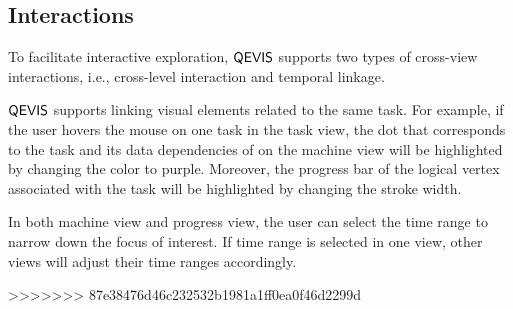 \subsection{Interactions}
%
%


To facilitate interactive exploration, $\mathsf{QEVIS}$ supports two types of cross-view interactions, i.e., cross-level interaction and temporal linkage.

$\mathsf{QEVIS}$ supports linking visual elements related to the same task. 
For example, if the user hovers the mouse on one task in the task view, the dot that corresponds to the task and its data dependencies of on the machine view will be highlighted by changing the color to purple. Moreover, the progress bar of the logical vertex associated with the task will be highlighted by changing the stroke width.   

In both machine view and progress view, the user can select the time range to narrow down the focus of interest. If time range is selected in one view, other views will adjust their time ranges accordingly.

>>>>>>> 87e38476d46c232532b1981a1ff0ea0f46d2299d
